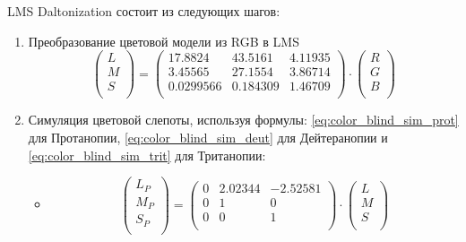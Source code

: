 \documentclass[a4paper,14pt, unknownkeysallowed]{extreport}
\begin{document}
    LMS Daltonization состоит из следующих шагов:
    \begin{enumerate}
        \item Преобразование цветовой модели из RGB в LMS
        \begin{equation}
            \begin{pmatrix}
                L \\
                M \\
                S \\
            \end{pmatrix} = 
            \begin{pmatrix}
                17.8824 & 43.5161 & 4.11935 \\
                3.45565 & 27.1554 & 3.86714 \\
                0.0299566 & 0.184309 & 1.46709 \\
            \end{pmatrix} \cdot
            \begin{pmatrix}
                R \\
                G \\
                B \\
            \end{pmatrix}
        \end{equation}

        \item Симуляция цветовой слепоты, используя формулы: \ref{eq:color_blind_sim_prot} для Протанопии, \ref{eq:color_blind_sim_deut} для Дейтеранопии и \ref{eq:color_blind_sim_trit} для Тританопии:
        \begin{itemize}
            \item \begin{equation}
                \label{eq:color_blind_sim_prot}
                \begin{pmatrix}
                    L_P \\
                    M_P \\
                    S_P \\
                \end{pmatrix} = 
                \begin{pmatrix}
                    0 & 2.02344 & -2.52581 \\
                    0 & 1 & 0 \\
                    0 & 0 & 1 \\
                \end{pmatrix} \cdot
                \begin{pmatrix}
                    L\\
                    M \\
                    S \\
                \end{pmatrix}
            \end{equation}
            

\end{itemize}
\end{enumerate}
\end{document}
